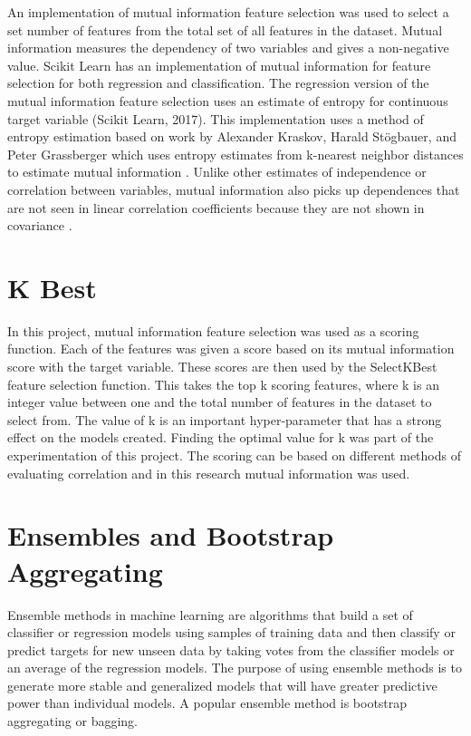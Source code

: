 \documentclass[12pt]{dalthesis}
\begin{document}
An implementation of mutual information feature selection was used to select a set number of features from the total set of all features in the dataset. Mutual information measures the dependency of two variables and gives a non-negative value. Scikit Learn has an implementation of mutual information for feature selection for both regression and classification. The regression version of the mutual information feature selection uses an estimate of entropy for continuous target variable (Scikit Learn, 2017). This implementation uses a method of entropy estimation based on work by Alexander Kraskov, Harald Stögbauer, and Peter Grassberger which uses entropy estimates from k-nearest neighbor distances to estimate mutual information \cite{mutualinfo} . Unlike other estimates of independence or correlation between variables, mutual information also picks up dependences that are not seen in linear correlation coefficients because they are not shown in covariance \cite{sklearn}.  

\section{K Best}

In this project, mutual information feature selection was used as a scoring function. Each of the features was given a score based on its mutual information score with the target variable. These scores are then used by the SelectKBest feature selection function. This takes the top k scoring features, where k is an integer value between one and the total number of features in the dataset to select from. The value of k is an important hyper-parameter that has a strong effect on the models created. Finding the optimal value for k was part of the experimentation of this project. The scoring can be based on different methods of evaluating correlation and in this research mutual information was used.

\section{Ensembles and Bootstrap Aggregating}
Ensemble methods in machine learning are algorithms that build a set of classifier or regression models using samples of training data and then classify or predict targets for new unseen data by taking votes from the classifier models or an average of the regression models. The purpose of using ensemble methods is to generate more stable and generalized models that will have greater predictive power than individual models. A popular ensemble method is bootstrap aggregating or bagging.\cite{ensemble} \\
\end{document}
